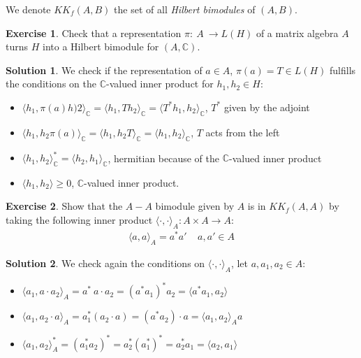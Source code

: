 \documentclass[a4paper]{article}
\theoremstyle{definition}
\theoremstyle{definition}
\theoremstyle{definition}
\theoremstyle{theorem}
\theoremstyle{theorem}
\newtheorem{exercise}{Exercise}
\theoremstyle{theorem}
\theoremstyle{definition}
\newtheorem{solution}{Solution}
\begin{document}
We denote $KK_f(A,B)$ the set of all \textit{Hilbert bimodules} of $(A,B)$.

\begin{exercise}
    Check that a representation $\pi:\ A \ \rightarrow L(H)$ of a matrix algebra $A$ turns $H$ into
    a Hilbert bimodule for $(A, \mathbb{C})$.
    \label{ex: bimodule}
\end{exercise}

\begin{solution}
    We check if the representation of $a \in A$, $\pi(a)=T \in L(H)$ fulfills
    the conditions on the $\mathbb{C}$-valued inner product for $h_1, h_2 \in H$:
    \begin{itemize}
        \item $\langle h_1, \pi(a) h)2\rangle _\mathbb{C} = \langle h_1, T h_2\rangle _\mathbb{C} =
            \langle T^* h_1, h_2\rangle _\mathbb{C}$, $T^*$ given by the adjoint
        \item $\langle h_1, h_2 \pi(a)\rangle _\mathbb{C} = \langle h_1, h_2 T\rangle _\mathbb{C} = \langle h_1, h_2\rangle _\mathbb{C}$, $T$ acts from the left
        \item $\langle h_1, h_2\rangle _\mathbb{C}^* = \langle h_2,h_1\rangle _\mathbb{C}$, hermitian because of the
            $\mathbb{C}$-valued inner product
        \item $\langle h_1, h_2\rangle  \ge 0$, $\mathbb{C}$-valued inner product.
    \end{itemize}
\end{solution}

\begin{exercise}
    Show that the $A-A$ bimodule given by $A$ is in $KK_f(A,A)$ by taking the following inner product
    $\langle \cdot,\cdot\rangle_A:A \times A \rightarrow A$:
    \begin{align*}
        \langle a, a\rangle_A = a^*a' \;\;\;\; a,a'\in A
    \end{align*}
    \label{exercise: inner-product}
\end{exercise}
\begin{solution}
    We check again the conditions on $\langle \cdot, \cdot\rangle _A$, let $a, a_1, a_2 \in A$:
    \begin{itemize}
        \item $\langle a_1, a\cdot a_2\rangle _A = a^*\ a\cdot a_2 = (a^*a_1)^* a_2 = \langle  a^*a_1, a_2\rangle  $
        \item $\langle a_1, a_2 \cdot a\rangle _A = a^*_1 (a_2\cdot a) = (a^*a_2)\cdot a = \langle a_1, a_2\rangle _A a$
        \item $\langle a_1, a_2\rangle _A^* = (a_1^* a_2)^* = a_2^*(a_1^*)^* = a_2^* a_1 = \langle a_2, a_1\rangle $
    \end{itemize}
\end{solution}
\end{document}
